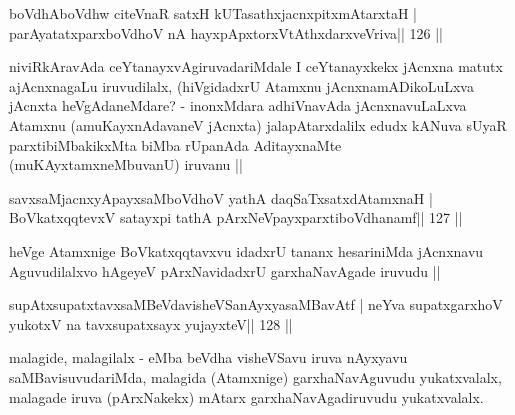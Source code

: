 \begin{shl}
boVdhAboVdhw citeVnaR satxH kUTasathxjacnxpitxmAtarxtaH |
parAyatatxparxboVdhoV nA hayxpApxtorxVtAthxdarxveVriva\hfill || 126 ||
\end{shl}

\begin{artha}
niviRkAravAda ceYtanayxvAgiruvadariMdale I ceYtanayxkekx jAcnxna matutx ajAcnxna\-gaLu iruvudilalx, (hiVgidadxrU Atamxnu jAcnxnamADikoLuLxva jAcnxta heVgAdaneMdare? - inonxMdara adhiVnavAda jAcnxnavuLaLxva Atamxnu (amuKayxnAdavaneV jAcnxta) jalapAtarxdalilx edudx kANuva sUyaR parxtibiMbakikxMta biMba rUpanAda AditayxnaMte (muKAyxtamxneMbuvanU) iruvanu ||
\end{artha}

\begin{shl}
savxsaMjacnxyA\s payxsaMboVdhoV yathA daqSaTxsatxdAtamxnaH |
BoVkatxqqtevxV satayxpi tathA pArxNeV\s payxparxtiboVdhanamf\hfill || 127 ||
\end{shl}

\begin{artha}
heVge Atamxnige BoVkatxqqtavxvu idadxrU tananx hesariniMda jAcnxnavu 
Aguvudilalxvo hAgeyeV pArxNavidadxrU garxhaNavAgade iruvudu ||
\end{artha} 

\begin{shl}
supAtxsupatxtavxsaMBeVdavisheVSanAyxyasaMBavAtf |
neYva supatxgarxhoV yukotxV na tavxsupatxsayx yujayxteV\hfill || 128 ||
\end{shl}

\begin{artha}
malagide, malagilalx - eMba beVdha visheVSavu iruva nAyxyavu saMBavisuvuda\-riMda, malagida (Atamxnige) garxhaNavAguvudu yukatxvalalx, malagade iruva (pArxNakekx) mAtarx garxhaNavAgadiruvudu yukatxvalalx.
\end{artha}

